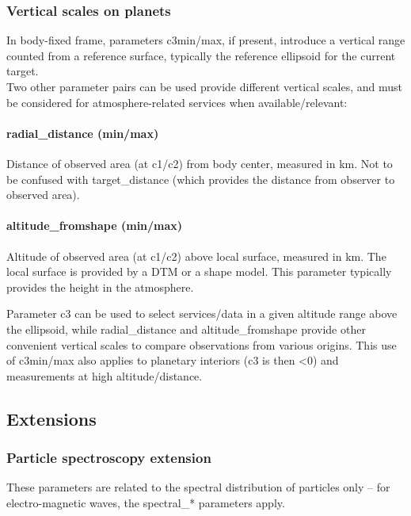 \documentclass[11pt,a4paper]{ivoa}
\begin{document}
\subsubsection{Vertical scales on planets}

In body-fixed frame, parameters c3min/max, if present, introduce a
vertical range counted from a reference surface, typically the reference
ellipsoid for the current target. \\

Two other parameter pairs can be used provide different vertical
scales, and must be considered for atmosphere-related services when
available/relevant:

\paragraph{radial\_distance (min/max)}

Distance of observed area (at c1/c2) from body center, measured in km.
Not to be confused with target\_distance
(which provides the distance from observer to observed area).

\paragraph{altitude\_fromshape (min/max)}

Altitude of observed area (at c1/c2) above local surface, measured in km.
The local surface is provided by a DTM or a shape model.
This parameter typically provides the height in the atmosphere.

Parameter c3 can be used to select services/data in a given altitude
range above the ellipsoid, while radial\_distance and altitude\_fromshape
provide other convenient vertical scales to compare observations from
various origins. This use of c3min/max also applies to planetary interiors
(c3 is then <0) and measurements at high altitude/distance.

\subsection{Extensions}

\subsubsection{Particle spectroscopy extension}

These parameters are related to the spectral distribution of particles
only -- for electro-magnetic waves, the spectral\_* parameters apply.
\end{document}
